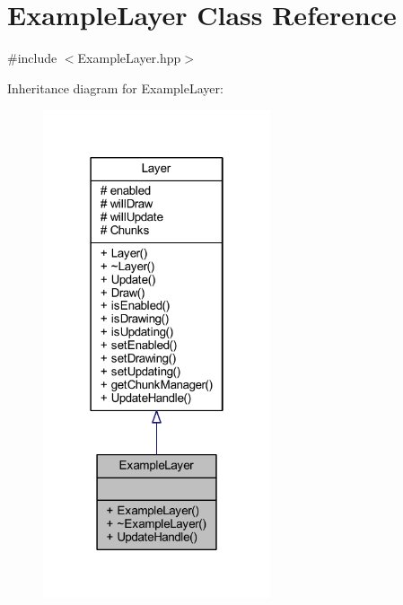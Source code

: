 \hypertarget{class_example_layer}{\section{Example\-Layer Class Reference}
\label{class_example_layer}
}


{\ttfamily \#include $<$Example\-Layer.\-hpp$>$}



Inheritance diagram for Example\-Layer\-:\nopagebreak
\begin{figure}[H]
\begin{center}
\leavevmode
\includegraphics[width=190pt]{class_example_layer__inherit__graph}
\end{center}
\end{figure}


